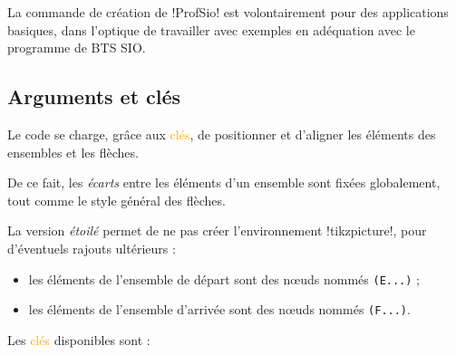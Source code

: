 \documentclass[french,a4paper,11pt]{article}
\newcommand\Cle[1]{{\small\sffamily\textlangle \textcolor{orange}{#1}\textrangle}}
\begin{document}
{{\begin{warningblock}
\smallskip

La commande de création de \packagetex!ProfSio! est volontairement pour des applications basiques, dans l'optique de travailler avec exemples en adéquation avec le programme de BTS SIO.
\end{warningblock}

\subsection{Arguments et clés}

\begin{DemoCode}

\end{DemoCode}

\begin{noteblock}
Le code se charge, grâce aux \Cle{clés}, de positionner et d'aligner les éléments des ensembles et les flèches.

De ce fait, les \textit{écarts} entre les éléments d'un ensemble sont fixées globalement, tout comme le style général des flèches.
\end{noteblock}

\begin{tipblock}
La version \textit{étoilé} permet de ne pas créer l'environnement \motcletex!tikzpicture!, pour d'éventuels rajouts ultérieurs :

\begin{itemize}
	\item les éléments de l'ensemble de départ sont des nœuds nommés \verb!(E...)! ;
	\item les éléments de l'ensemble d'arrivée sont des nœuds nommés \verb!(F...)!.
\end{itemize}
\vspace*{-\baselineskip}\leavevmode
\end{tipblock}


\begin{tipblock}
Les \Cle{clés} disponibles sont :


\end{tipblock}}}
\end{document}
